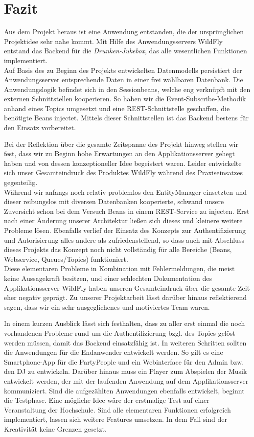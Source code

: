\section{Fazit}
Aus dem Projekt heraus ist eine Anwendung entstanden, die der ursprünglichen Projektidee sehr nahe kommt. Mit Hilfe des Anwendungsservers WildFly entstand das Backend für die \textit{Drunken-Jukebox}, das alle wesentlichen Funktionen implementiert.\\
Auf Basis des zu Beginn des Projekts entwickelten Datenmodells persistiert der Anwendungsserver entsprechende Daten in einer frei wählbaren Datenbank. Die Anwendungslogik befindet sich in den Sessionbeans, welche eng verknüpft mit den externen Schnittstellen kooperieren. So haben wir die Event-Subscribe-Methodik anhand eines Topics umgesetzt und eine REST-Schnittstelle geschaffen, die benötigte Beans injectet. Mittels dieser Schnittstellen ist das Backend bestens für den Einsatz vorbereitet. 

Bei der Reflektion über die gesamte Zeitspanne des Projekt hinweg stellen wir fest, dass wir zu Beginn hohe Erwartungen an den Applikationsserver gehegt haben und von dessen konzeptioneller Idee begeistert waren. Leider entwickelte sich unser Gesamteindruck des Produktes WildFly während des Praxiseinsatzes gegenteilig. \\
Während wir anfangs noch relativ problemlos den EntityManager einsetzten und dieser reibungslos mit diversen Datenbanken kooperierte, schwand unsere Zuversicht schon bei dem Versuch Beans in einem REST-Service zu injecten. Erst nach einer Änderung unserer Architektur ließen sich dieses und kleinere weitere Probleme lösen. Ebenfalls verlief der Einsatz des Konzepts zur Authentifizierung und Autorisierung alles andere als zufriedenstellend, so dass auch mit Abschluss dieses Projekts das Konzept noch nicht vollständig für alle Bereiche (Beans, Webservice, Queues/Topics) funktioniert.\\
Diese elementaren Probleme in Kombination mit Fehlermeldungen, die meist keine Aussagekraft besitzen, und einer schlechten Dokumentation des Applikationsserver WildFly haben unseren Gesamteindruck über die gesamte Zeit eher negativ geprägt. Zu unserer Projektarbeit lässt darüber hinaus reflektierend sagen, dass wir ein sehr ausgeglichenes und motiviertes Team waren. 

In einem kurzen Ausblick lässt sich festhalten, dass zu aller erst einmal die noch vorhandenen Probleme rund um die Authentifizierung bzgl. des Topics gelöst werden müssen, damit das Backend einsatzfähig ist. In weiteren Schritten sollten die Anwendungen für die Endanwender entwickelt werden. So gilt es eine Smartphone-App für die PartyPeople und ein Webinterface für den Admin bzw. den DJ zu entwickeln. Darüber hinaus muss ein Player zum Abspielen der Musik entwickelt werden, der mit der laufenden Anwendung auf dem Applikationsserver kommuniziert.
Sind die aufgezählten Anwendungen ebenfalls entwickelt, beginnt die Testphase. Eine mögliche Idee wäre der erstmalige Test auf einer Veranstaltung der Hochschule. Sind alle elementaren Funktionen erfolgreich implementiert, lassen sich weitere Features umsetzen. In dem Fall sind der Kreativität keine Grenzen gesetzt.